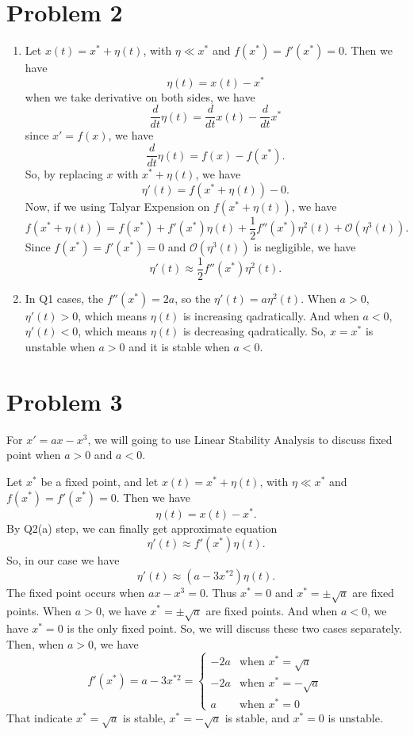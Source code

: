 \documentclass[12pt]{exam}
\newcommand{\BO}{\mathcal{O}}
\begin{document}
\section*{Problem 2}
\begin{enumerate}
	\item Let $x(t) = x^* + \eta(t)$, with $\eta \ll x^*$ and $f(x^*) = f'(x^*) = 0$. Then we have
		\[\eta(t) = x(t) - x^*\]
	when we take derivative on both sides, we have
		\[\frac{d}{dt}\eta(t) = \frac{d}{dt}x(t) - \frac{d}{dt}x^*\]
	since $x'=f(x)$, we have
		\[\frac{d}{dt}\eta(t) = f(x) - f(x^*).\]
	So, by replacing $x$ with $x^* + \eta(t)$, we have
		\[\eta'(t) = f(x^* + \eta(t)) - 0.\]
	Now, if we using Talyar Expension on $f(x^* + \eta(t))$, we have
		\[f(x^* + \eta(t)) = f(x^*) + f'(x^*)\eta(t) + \frac{1}{2}f''(x^*)\eta^2(t) + \BO(\eta^3(t)).\]
	Since $f(x^*) = f'(x^*) = 0$ and $\BO(\eta^3(t))$ is negligible, we have
		\[\eta'(t) \approx \frac{1}{2}f''(x^*)\eta^2(t).\]

	\item In Q1 cases, the $f''(x^*) = 2a$, so the $\eta'(t) = a\eta^2(t)$. When $a > 0$, $\eta'(t) > 0$, which means $\eta(t)$ is increasing qadratically. And when $a < 0$, $\eta'(t) < 0$, which means $\eta(t)$ is decreasing qadratically. So, $x=x^*$ is unstable when $a > 0$ and it is stable when $a < 0$.
	
\end{enumerate}

\section*{Problem 3}
For $x'=ax-x^3$, we will going to use Linear Stability Analysis to discuss fixed point when $a > 0$ and $a < 0$.

Let $x^*$ be a fixed point, and let $x(t) = x^* + \eta(t)$, with $\eta \ll x^*$ and $f(x^*) = f'(x^*) = 0$. Then we have
	\[\eta(t) = x(t) - x^*.\]
By Q2(a) step, we can finally get approximate equation
	\[\eta'(t) \approx f'(x^*)\eta(t).\]
So, in our case we have
	\[\eta'(t) \approx (a - 3x^{*2})\eta(t).\]
The fixed point occurs when $ax-x^3 = 0$. Thus $x^*=0$ and $x^*=\pm\sqrt{a}$ are fixed points. When $a > 0$, we have $x^*=\pm\sqrt{a}$ are fixed points. And when $a < 0$, we have $x^*=0$ is the only fixed point. So, we will discuss these two cases separately.
Then, when $a > 0$, we have
\[ f'(x^*) = a - 3x^{*2} =
\begin{cases}
	-2a & \text{when } x^* = \sqrt{a} \\
	-2a & \text{when } x^* = -\sqrt{a} \\
	a & \text{when } x^* = 0
\end{cases}
\]
That indicate $x^* = \sqrt{a}$ is stable, $x^* = -\sqrt{a}$ is stable, and $x^* = 0$ is unstable.
\end{document}
